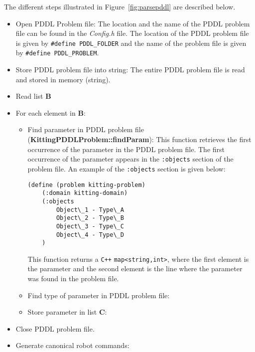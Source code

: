 The different steps illustrated in Figure~\ref{fig:parsepddl} are described below.
\begin{itemize}
\item Open PDDL Problem file: The location and the name of the PDDL problem file can be found in the \textit{Config.h} file. The location of the PDDL problem file is given by \texttt{\#define PDDL\_FOLDER} and the name of the problem file is given by \texttt{\#define PDDL\_PROBLEM}.
\item Store PDDL problem file into string: The entire PDDL problem file is read and stored in memory (string).
\item Read list \textbf{B}
\item For each element in \textbf{B}:
\begin{itemize}
\item Find parameter in PDDL problem file (\textbf{\small{KittingPDDLProblem::findParam}}): This function retrieves the first occurrence of the parameter in the PDDL problem file. The first occurrence of the parameter appears in the \texttt{:objects} section of the problem file. An example of the \texttt{:objects} section is given below:

    \begin{minipage}{.5\paperwidth}
\begin{mylisting}
\begin{Verbatim}[commandchars=\\\{\},commandchars=+\[\],fontsize=\small,numbersep=3pt]
(define (problem kitting-problem)
	(:domain kitting-domain)
	(:objects
		Object\_1 - Type\_A
		Object\_2 - Type\_B
		Object\_3 - Type\_C
		Object\_4 - Type\_D
	)
\end{Verbatim}
\end{mylisting}
\end{minipage}

This function returns a \verb!C++! \texttt{map<string,int>}, where the first element is the parameter and the second element is the line where the parameter was found in the problem file.
\item Find type of parameter in PDDL problem file:
\item Store parameter in list \textbf{C}:
\end{itemize}
\item Close PDDL problem file.
\item Generate canonical robot commands:

\end{itemize}




